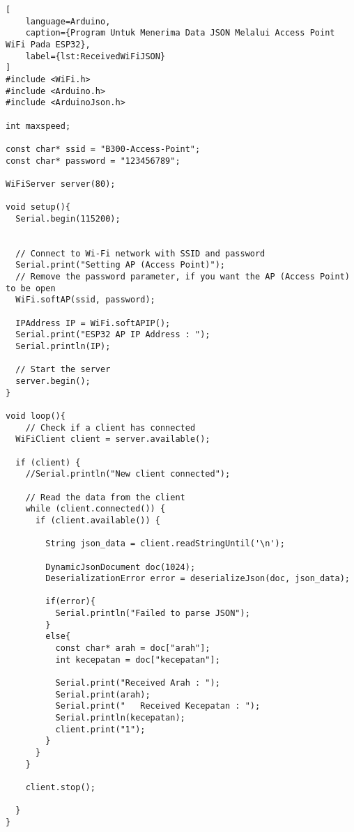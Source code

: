 \begin{lstlisting}[
    language=Arduino,
    caption={Program Untuk Menerima Data JSON Melalui Access Point WiFi Pada ESP32},
    label={lst:ReceivedWiFiJSON}
]
#include <WiFi.h>
#include <Arduino.h>
#include <ArduinoJson.h>

int maxspeed;

const char* ssid = "B300-Access-Point";
const char* password = "123456789";

WiFiServer server(80);

void setup(){
  Serial.begin(115200);


  // Connect to Wi-Fi network with SSID and password
  Serial.print("Setting AP (Access Point)");
  // Remove the password parameter, if you want the AP (Access Point) to be open
  WiFi.softAP(ssid, password);
 
  IPAddress IP = WiFi.softAPIP();
  Serial.print("ESP32 AP IP Address : ");
  Serial.println(IP);

  // Start the server
  server.begin();
}

void loop(){
    // Check if a client has connected
  WiFiClient client = server.available();

  if (client) {
    //Serial.println("New client connected");
    
    // Read the data from the client
    while (client.connected()) {
      if (client.available()) {
    
        String json_data = client.readStringUntil('\n');

        DynamicJsonDocument doc(1024);
        DeserializationError error = deserializeJson(doc, json_data);

        if(error){
          Serial.println("Failed to parse JSON");
        }
        else{
          const char* arah = doc["arah"];
          int kecepatan = doc["kecepatan"];

          Serial.print("Received Arah : ");
          Serial.print(arah);
          Serial.print("   Received Kecepatan : ");
          Serial.println(kecepatan);
          client.print("1");
        }
      }
    }

    client.stop();

  }
}
\end{lstlisting}

